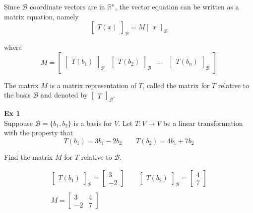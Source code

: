 \documentclass{article}
\begin{document}
  Since $ \mathcal{B} $ coordinate vectors are in $ \mathbb{R}^{n} $, the vector equation can be written as a matrix equation, namely
  \[
    \begin{bmatrix}
      T(x)
    \end{bmatrix}_\mathcal{B}=M
    \begin{bmatrix}
      x
    \end{bmatrix}_\mathcal{B}
  \]

  where 
  \[
    M=\begin{bmatrix}
      \begin{bmatrix}
        T(b_1)
      \end{bmatrix}_\mathcal{B} &\begin{bmatrix}
        T(b_2)
      \end{bmatrix}_\mathcal{B} &... 
      &\begin{bmatrix}
        T(b_n)
      \end{bmatrix}_\mathcal{B}
    \end{bmatrix}
  \]
 
  The matrix $ M $ is a matrix representation of $ T $, called the matrix for $ T $ relative to the basis $ \mathcal{B} $ and denoted by $ \begin{bmatrix}
    T
  \end{bmatrix}_\mathcal{B} $.
  
  \textbf{Ex 1}\\
  Suppouse $ \mathcal{B}=\{ b_1,b_2 \} $ is a basis for $ V $. Let $ T: V\to V $ be a linear transformation with the property that
  \[
    T(b_1)=3b_1-2b_2 \qquad T(b_2)=4b_1+7b_2
  \]

  Find the matrix $ M $ for $ T $ relative to $ \mathcal{B} $.

  \[
    \begin{gathered}
    \begin{bmatrix}
      T(b_1)
    \end{bmatrix}_\mathcal{B}=
    \begin{bmatrix}
      3\\
      -2
    \end{bmatrix} \qquad 
    \begin{bmatrix}
      T(b_2)
    \end{bmatrix}_\mathcal{B}=
    \begin{bmatrix}
      4\\
      7
    \end{bmatrix}\\
    ~\\
    M=\begin{bmatrix}
      3 &4\\
      -2 &7
    \end{bmatrix}
    \end{gathered}
  \]
\end{document}
